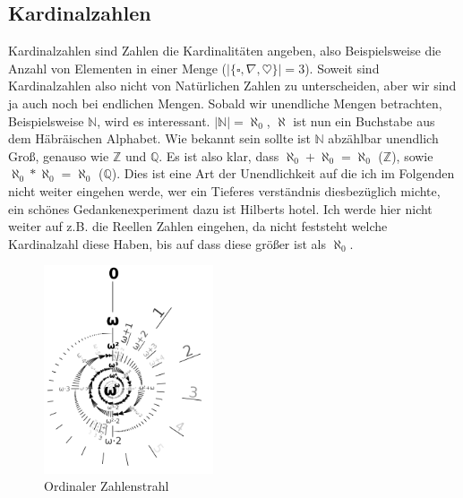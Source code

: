 \documentclass{scrartcl}
\begin{document}
\subsection{Kardinalzahlen}
Kardinalzahlen sind Zahlen die Kardinalitäten angeben, also Beispielsweise die
Anzahl von Elementen in einer Menge ($|\{\square, \nabla, \heartsuit \} | =
3$). Soweit sind Kardinalzahlen also nicht von Natürlichen Zahlen zu
unterscheiden, aber wir sind ja auch noch bei endlichen Mengen. Sobald wir
unendliche Mengen betrachten, Beispielsweise $\mathbb{N}$, wird es interessant.
$|\mathbb{N}| = \aleph_0$, $\aleph$ ist nun ein Buchstabe aus dem Häbräischen
Alphabet. Wie bekannt sein sollte ist $\mathbb{N}$ abzählbar unendlich Groß,
genauso wie $\mathbb{Z}$ und $\mathbb{Q}$. Es ist also klar, dass $\aleph_0 +
\aleph_0 = \aleph_0$ ($\mathbb{Z}$), sowie $\aleph_0 * \aleph_0 = \aleph_0$
($\mathbb{Q}$). Dies ist eine Art der Unendlichkeit auf die ich im Folgenden
nicht weiter eingehen werde, wer ein Tieferes verständnis diesbezüglich michte,
ein schönes Gedankenexperiment dazu ist Hilberts hotel. Ich werde hier nicht
weiter auf z.B. die Reellen Zahlen eingehen, da nicht feststeht welche
Kardinalzahl diese Haben, bis auf dass diese größer ist als $\aleph_0$.



\begin{figure}
    \centering
    \includegraphics[width=5cm]{ordinal.png}
    \caption{\label{fig:ordinal.png}Ordinaler Zahlenstrahl}
\end{figure}
\end{document}
